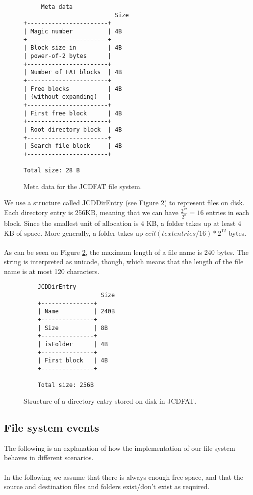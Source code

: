 \documentclass[11pt]{article}
\begin{document}
        \begin{figure}[ht]
            \begin{verbatim}
     Meta data
                          Size
+-----------------------+
| Magic number          | 4B
+-----------------------+
| Block size in         | 4B
| power-of-2 bytes      |
+-----------------------+
| Number of FAT blocks  | 4B
+-----------------------+
| Free blocks           | 4B
| (without expanding)   |
+-----------------------+
| First free block      | 4B
+-----------------------+
| Root directory block  | 4B
+-----------------------+
| Search file block     | 4B
+-----------------------+

Total size: 28 B
            \end{verbatim}
            \caption{Meta data for the JCDFAT file system.}
            \label{fig:meta_data}
        \end{figure}

        We use a structure called JCDDirEntry (see Figure \ref{fig:directory_entry}) to represent files on disk. Each directory entry is 256KB, meaning that we can have $\frac{2^{12}}{2^8} = 16$ entries in each block. Since the smallest unit of allocation is 4 KB, a folder takes up at least 4 KB of space. More generally, a folder takes up $ceil(text{entries} / 16) * 2^{12}$ bytes.\\
        \\
        As can be seen on Figure \ref{fig:directory_entry}, the maximum length of a file name is 240 bytes. The string is interpreted as unicode, though, which means
        that the length of the file name is at most 120 characters.

        \begin{figure}[ht]
            \begin{verbatim}
    JCDDirEntry
                      Size
    +---------------+
    | Name          | 240B
    +---------------+
    | Size          | 8B
    +---------------+
    | isFolder      | 4B
    +---------------+
    | First block   | 4B
    +---------------+

    Total size: 256B
            \end{verbatim}
            \caption{Structure of a directory entry stored on disk in JCDFAT.}
            \label{fig:directory_entry}
        \end{figure}

    \subsection{File system events}\label{file-system-events}
        The following is an explanation of how the implementation of our file
        system behaves in different scenarios.\\
        \\
        In the following we assume that there is always enough free space, and
        that the source and destination files and folders exist/don't exist as
        required.\\
\end{document}
